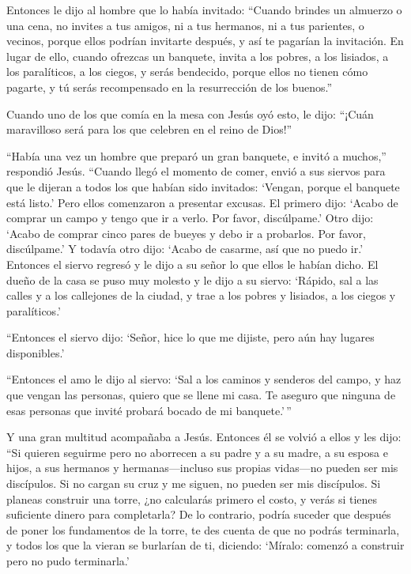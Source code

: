  Entonces le dijo al hombre que lo había invitado: ``Cuando
brindes un almuerzo o una cena, no invites a tus amigos, ni a tus
hermanos, ni a tus parientes, o vecinos, porque ellos podrían invitarte
después, y así te pagarían la invitación.  En lugar de
ello, cuando ofrezcas un banquete, invita a los pobres, a los lisiados,
a los paralíticos, a los ciegos,  y serás bendecido, porque
ellos no tienen cómo pagarte, y tú serás recompensado en la resurrección
de los buenos.''

 Cuando uno de los que comía en la mesa con Jesús oyó esto,
le dijo: ``¡Cuán maravilloso será para los que celebren en el reino de
Dios!''

 ``Había una vez un hombre que preparó un gran banquete, e
invitó a muchos,'' respondió Jesús.  ``Cuando llegó el
momento de comer, envió a sus siervos para que le dijeran a todos los
que habían sido invitados: `Vengan, porque el banquete está listo.'
 Pero ellos comenzaron a presentar excusas. El primero
dijo: `Acabo de comprar un campo y tengo que ir a verlo. Por favor,
discúlpame.'  Otro dijo: `Acabo de comprar cinco pares de
bueyes y debo ir a probarlos. Por favor, discúlpame.' Y todavía otro
dijo:  `Acabo de casarme, así que no puedo ir.'
 Entonces el siervo regresó y le dijo a su señor lo que
ellos le habían dicho. El dueño de la casa se puso muy molesto y le dijo
a su siervo: `Rápido, sal a las calles y a los callejones de la ciudad,
y trae a los pobres y lisiados, a los ciegos y paralíticos.'

 ``Entonces el siervo dijo: `Señor, hice lo que me dijiste,
pero aún hay lugares disponibles.'

 ``Entonces el amo le dijo al siervo: `Sal a los caminos y
senderos del campo, y haz que vengan las personas, quiero que se llene
mi casa.  Te aseguro que ninguna de esas personas que
invité probará bocado de mi banquete.'\,''

 Y una gran multitud acompañaba a Jesús. Entonces él se
volvió a ellos y les dijo:  ``Si quieren seguirme pero no
aborrecen a su padre y a su madre, a su esposa e hijos, a sus hermanos y
hermanas---incluso sus propias vidas---no pueden ser mis discípulos.
 Si no cargan su cruz y me siguen, no pueden ser mis
discípulos.  Si planeas construir una torre, ¿no calcularás
primero el costo, y verás si tienes suficiente dinero para completarla?
 De lo contrario, podría suceder que después de poner los
fundamentos de la torre, te des cuenta de que no podrás terminarla, y
todos los que la vieran se burlarían de ti, diciendo: 
`Míralo: comenzó a construir pero no pudo terminarla.'

